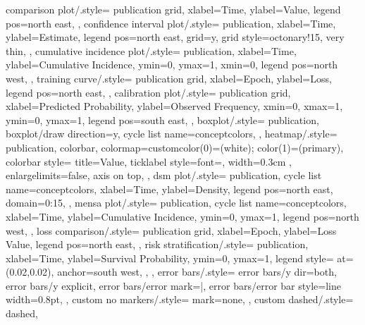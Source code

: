 {    comparison plot/.style={
        publication grid,
        xlabel={Time},
        ylabel={Value},
        legend pos=north east,
    },
    confidence interval plot/.style={
        publication,
        xlabel={Time},
        ylabel={Estimate},
        legend pos=north east,
        grid=y,
        grid style={octonary!15, very thin},
    },
    cumulative incidence plot/.style={
        publication,
        xlabel={Time},
        ylabel={Cumulative Incidence},
        ymin=0,
        ymax=1,
        xmin=0,
        legend pos=north west,
    },
    training curve/.style={
        publication grid,
        xlabel={Epoch},
        ylabel={Loss},
        legend pos=north east,
    },
    calibration plot/.style={
        publication grid,
        xlabel={Predicted Probability},
        ylabel={Observed Frequency},
        xmin=0,
        xmax=1,
        ymin=0,
        ymax=1,
        legend pos=south east,
    },
    boxplot/.style={
        publication,
        boxplot/draw direction=y,
        cycle list name=conceptcolors,
    },
    heatmap/.style={
        publication,
        colorbar,
        colormap={custom}{color(0)=(white); color(1)=(primary)},
        colorbar style={
            title={\footnotesize Value},
            ticklabel style={font=\tiny},
            width=0.3cm
        },
        enlargelimits=false,
        axis on top,
    },
    dsm plot/.style={
        publication,
        cycle list name=conceptcolors,
        xlabel={Time},
        ylabel={Density},
        legend pos=north east,
        domain=0:15,
    },
    mensa plot/.style={
        publication,
        cycle list name=conceptcolors,
        xlabel={Time},
        ylabel={Cumulative Incidence},
        ymin=0,
        ymax=1,
        legend pos=north west,
    },
    loss comparison/.style={
        publication grid,
        xlabel={Epoch},
        ylabel={Loss Value},
        legend pos=north east,
    },
    risk stratification/.style={
        publication,
        xlabel={Time},
        ylabel={Survival Probability},
        ymin=0,
        ymax=1,
        legend style={
            at={(0.02,0.02)},
            anchor=south west,
        },
    },
    error bars/.style={
        error bars/y dir=both,
        error bars/y explicit,
        error bars/error mark=|,
        error bars/error bar style={line width=0.8pt},
    },
    custom no markers/.style={
        mark=none,
    },
    custom dashed/.style={
        dashed,
}}

